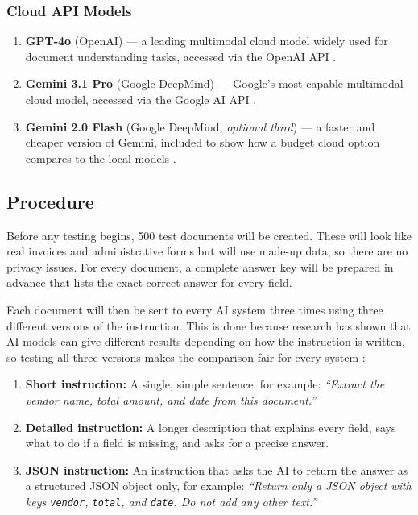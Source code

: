 \subsubsection*{Cloud API Models}

\begin{enumerate}
    \item \textbf{GPT-4o} (OpenAI) --- a leading multimodal cloud model widely used for document understanding tasks, accessed via the OpenAI API \cite{openai_gpt4o_2024}.
    \item \textbf{Gemini 3.1 Pro} (Google DeepMind) --- Google's most capable multimodal cloud model, accessed via the Google AI API \cite{google_gemini_2025}.
    \item \textbf{Gemini 2.0 Flash} (Google DeepMind, \textit{optional third}) --- a faster and cheaper version of Gemini, included to show how a budget cloud option compares to the local models \cite{google_gemini_2025}.
\end{enumerate}

\subsection{Procedure}

Before any testing begins, 500 test documents will be created. These will look like real invoices and administrative forms but will use made-up data, so there are no privacy issues. For every document, a complete answer key will be prepared in advance that lists the exact correct answer for every field.

Each document will then be sent to every AI system three times using three different versions of the instruction. This is done because research has shown that AI models can give different results depending on how the instruction is written, so testing all three versions makes the comparison fair for every system \cite{anlsstar_2024, gemma4_phi4_qwen3_2026}:

\begin{enumerate}
    \item \textbf{Short instruction:} A single, simple sentence, for example: \emph{``Extract the vendor name, total amount, and date from this document.''}
    \item \textbf{Detailed instruction:} A longer description that explains every field, says what to do if a field is missing, and asks for a precise answer.
    \item \textbf{JSON instruction:} An instruction that asks the AI to return the answer as a structured JSON object only, for example: \emph{``Return only a JSON object with keys \texttt{vendor}, \texttt{total}, and \texttt{date}. Do not add any other text.''}
\end{enumerate}


